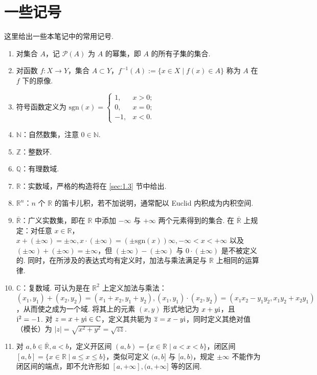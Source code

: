 \documentclass[../main.tex]{subfiles}
\begin{document}
\chapter*{一些记号}

这里给出一些本笔记中的常用记号. 

\begin{enumerate}

\item 对集合 $A$，记 $\mathcal{P}(A)$ 为 $A$ 的幂集，即 $A$ 的所有子集的集合. 

\item 对函数 $f:X \to Y$，集合 $A \subset Y$，$f^{-1}(A) := \{x \in X \mid f(x) \in A\}$ 称为 $A$ 在 $f$ 下的原像. 

\item 符号函数定义为 $\mathrm{sgn}(x) = \begin{cases}
    1, & x > 0; \\
    0, & x = 0; \\
    -1, & x < 0. 
\end{cases}$

\item $\mathbb N$：自然数集，注意 $0 \in \mathbb N$. 

\item $\mathbb Z$：整数环. 

\item $\mathbb Q$：有理数域. 

\item $\mathbb R$：实数域，严格的构造将在 \ref{sec:1.3} 节中给出. 

\item $\mathbb R^n$：$n$ 个 $\mathbb R$ 的笛卡儿积，若不加说明，通常配以 Euclid 内积成为内积空间. 

\item $\overline{\mathbb R}$：广义实数集，即在 $\mathbb R$ 中添加 $-\infty$ 与 $+\infty$ 两个元素得到的集合. 在 $\overline{\mathbb R}$ 上规定：对任意 $x \in \mathbb R$，$x + (\pm\infty) = \pm\infty, x \cdot (\pm\infty) = (\pm\mathrm{sgn}(x))\infty, -\infty < x < +\infty$ 以及 $(\pm\infty) + (\pm\infty) = \pm\infty$，但 $(\pm\infty) - (\pm\infty)$ 与 $0 \cdot (\pm\infty)$ 是不被定义的. 同时，在所涉及的表达式均有定义时，加法与乘法满足与 $\mathbb R$ 上相同的运算律. 

\item $\mathbb C$：复数域. 可认为是在 $\mathbb R^2$ 上定义加法与乘法：$(x_1, y_1) + (x_2, y_2) = (x_1 + x_2, y_1 + y_2), (x_1, y_1) \cdot (x_2, y_2) = (x_1 x_2 - y_1 y_2, x_1 y_2 + x_2 y_1)$，从而使之成为一个域. 将其上的元素 $(x, y)$ 形式地记为 $x + y\mathrm{i}$，且 $\mathrm{i}^2 = -1$. 对 $z = x + y\mathrm{i} \in \mathbb C$，定义其共轭为 $\overline{z} = x - y\mathrm{i}$，同时定义其绝对值（模长）为 $|z| = \sqrt{x^2 + y^2} = \sqrt{z \overline{z}}$. 

\item 对 $a, b \in \overline{\mathbb R}, a < b$，定义开区间 $(a, b) = \{x \in \mathbb R \mid a < x < b\}$，闭区间 $[a, b] = \{x \in \mathbb R \mid a \leqslant x \leqslant b\}$，类似可定义 $(a, b]$ 与 $[a, b)$，规定 $\pm\infty$ 不能作为闭区间的端点，即不允许形如 $[a, +\infty], (a, +\infty]$ 等的区间. 
\end{enumerate}
\end{document}
